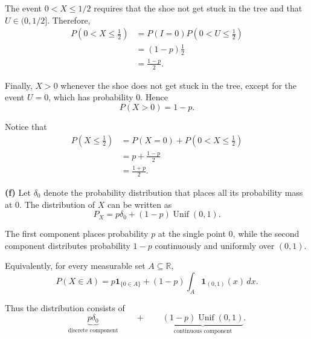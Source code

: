 \documentclass[11pt]{article}
\begin{document}
\begin{solutionbox}
The event \(0<X\leq1/2\) requires that the shoe not get stuck in the tree and
that \(U\in(0,1/2]\). Therefore,
\[
\begin{aligned}
P\left(0<X\leq\frac12\right)
&=P(I=0)P\left(0<U\leq\frac12\right)\\
&=(1-p)\frac12\\
&=\boxed{\frac{1-p}{2}}.
\end{aligned}
\]

Finally, \(X>0\) whenever the shoe does not get stuck in the tree, except for
the event \(U=0\), which has probability \(0\). Hence
\[
\boxed{P(X>0)=1-p}.
\]

Notice that
\[
\begin{aligned}
P\left(X\leq\frac12\right)
&=P(X=0)+P\left(0<X\leq\frac12\right)\\
&=p+\frac{1-p}{2}\\
&=\frac{1+p}{2}.
\end{aligned}
\]

\textbf{(f)} Let \(\delta_0\) denote the probability distribution that places
all its probability mass at \(0\). The distribution of \(X\) can be written as
\[
\boxed{
P_X
=
p\delta_0
+
(1-p)\operatorname{Unif}(0,1).
}
\]

The first component places probability \(p\) at the single point \(0\), while
the second component distributes probability \(1-p\) continuously and
uniformly over \((0,1)\).

Equivalently, for every measurable set \(A\subseteq\mathbb R\),
\[
\boxed{
P(X\in A)
=
p\mathbf{1}_{\{0\in A\}}
+
(1-p)\int_A\mathbf{1}_{(0,1)}(x)\,dx.
}
\]

Thus the distribution consists of
\[
\underbrace{p\delta_0}_{\text{discrete component}}
\qquad+\qquad
\underbrace{(1-p)\operatorname{Unif}(0,1)}
_{\text{continuous component}}.
\]


\end{solutionbox}

  



 
\end{document}
